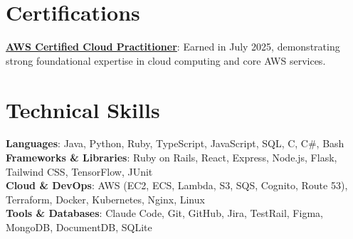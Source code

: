 \documentclass[a4paper,11pt]{article}
\begin{document}
\section{Certifications}
 \begin{itemize}[leftmargin=0.15in, label={}]
    \small{\item{
     \textbf{\href{https://www.credly.com/badges/4285aee7-9142-4f4a-9ee7-b862166762a9/linked_in_profile}{AWS Certified Cloud Practitioner}}{: Earned in July 2025, demonstrating strong foundational expertise in cloud computing and core AWS services.}
    }}
 \end{itemize}
 

\section{Technical Skills}
 \begin{itemize}[leftmargin=0.15in, label={}]
    \small{\item{
     \textbf{Languages}{: Java, Python, Ruby, TypeScript, JavaScript, SQL, C, C\#, Bash} \\
     \textbf{Frameworks \& Libraries}{: Ruby on Rails, React, Express, Node.js, Flask, Tailwind CSS, TensorFlow, JUnit} \\
     \textbf{Cloud \& DevOps}{: AWS (EC2, ECS, Lambda, S3, SQS, Cognito, Route 53), Terraform, Docker, Kubernetes, Nginx, Linux} \\
     \textbf{Tools \& Databases}{: Claude Code, Git, GitHub, Jira, TestRail, Figma, MongoDB, DocumentDB, SQLite}
    }}
 \end{itemize}

\end{document}
